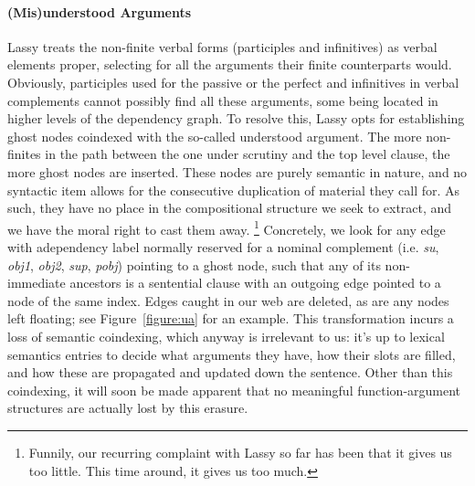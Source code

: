 \paragraph{(Mis)understood Arguments}
Lassy treats the non-finite verbal forms (participles and infinitives) as verbal elements proper, selecting for all the arguments their finite counterparts would.
Obviously, participles used for the passive or the perfect and infinitives in verbal complements cannot possibly find all these arguments, some being located in higher levels of the dependency graph.
To resolve this, Lassy opts for establishing ghost nodes coindexed with the so-called understood argument.
The more non-finites in the path between the one under scrutiny and the top level clause, the more ghost nodes are inserted.
These nodes are purely semantic in nature, and no syntactic item allows for the consecutive duplication of material they call for.
As such, they have no place in the compositional structure we seek to extract, and we have the moral right to cast them away.%
	\footnote{Funnily, our recurring complaint with Lassy so far has been that it gives us too little. 
	This time around, it gives us too much.}
Concretely, we look for any edge with adependency label normally reserved for a nominal complement (i.e. \textit{su}, \textit{obj1}, \textit{obj2}, \textit{sup}, \textit{pobj}) pointing to a ghost node, such that any of its non-immediate ancestors is a sentential clause with an outgoing edge pointed to a node of the same index.
Edges caught in our web are deleted, as are any nodes left floating; see Figure~\ref{figure:ua} for an example.
This transformation incurs a loss of semantic coindexing, which anyway is irrelevant to us: it's up to lexical semantics entries to decide what arguments they have, how their slots are filled, and how these are propagated and updated down the sentence.
Other than this coindexing, it will soon be made apparent that no meaningful function-argument structures are actually lost by this erasure.


